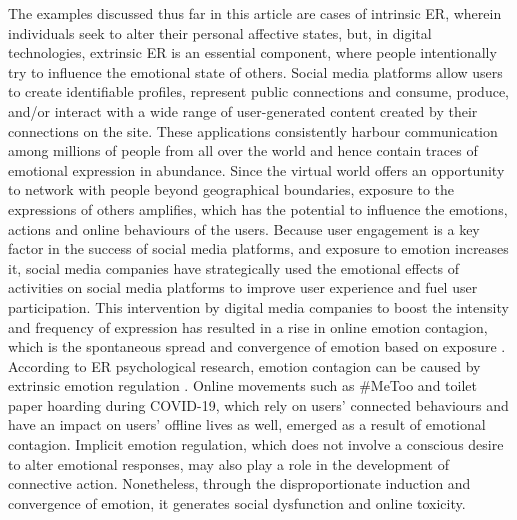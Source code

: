 \documentclass[lettersize,journal]{IEEEtran}
\begin{document}
The examples discussed thus far in this article are cases of intrinsic ER, wherein individuals seek to alter their personal affective states, but, in digital technologies, extrinsic ER is an essential component, where people intentionally try to influence the emotional state of others. Social media platforms allow users to create identifiable profiles, represent public connections and consume, produce, and/or interact with a wide range of user-generated content created by their connections on the site. These applications consistently harbour communication among millions of people from all over the world and hence contain traces of emotional expression in abundance. Since the virtual world offers an opportunity to network with people beyond geographical boundaries, exposure to the expressions of others amplifies, which has the potential to influence the emotions, actions and online behaviours of the users. Because user engagement is a key factor in the success of social media platforms, and exposure to emotion increases it, social media companies have strategically used the emotional effects of activities on social media platforms to improve user experience and fuel user participation. This intervention by digital media companies to boost the intensity and frequency of expression has resulted in a rise in online emotion contagion, which is the spontaneous spread and convergence of emotion based on exposure \cite{goldenberg2020digital}. According to ER psychological research, emotion contagion can be caused by extrinsic emotion regulation \cite{elfenbein2014many}. Online movements such as \#MeToo and toilet paper hoarding during COVID-19, which rely on users' connected behaviours and have an impact on users' offline lives as well, emerged as a result of emotional contagion. Implicit emotion regulation, which does not involve a conscious desire to alter emotional responses, may also play a role in the development of connective action. Nonetheless, through the disproportionate induction and convergence of emotion, it generates social dysfunction and online toxicity.
\end{document}
